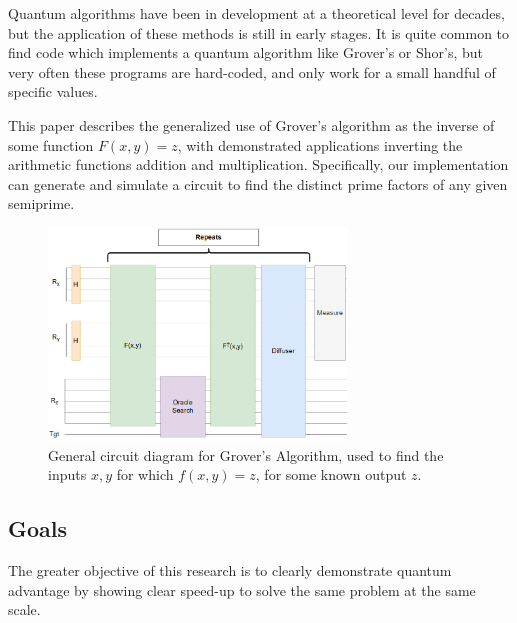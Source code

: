 \documentclass[twocolumn]{cinc}
\begin{document}
Quantum algorithms have been in development at a theoretical level for
decades, but the application of these methods is still in early stages.
It is quite common to find code which implements a quantum algorithm like
Grover's\cite{grover} or Shor's\cite{shor}, but very often these 
programs are hard-coded, and only
work for a small handful of specific values\cite{shors_ibm}.

This paper describes the generalized use of Grover's algorithm as the
inverse of some function $F(x, y) = z$, with demonstrated applications
inverting the arithmetic functions addition and multiplication. Specifically,
our implementation can generate and simulate a circuit to find the distinct prime
factors of any given semiprime.

\begin{figure}[ht]\label{fig:FIGURA1}
\centering
\includegraphics[width=7.9cm]{grover_inversion.png}
\caption{General circuit diagram for Grover's Algorithm, used to find 
the inputs $x, y$ for which $f(x,y)=z$, for some known output $z$.}
\end{figure}

  \subsection{Goals}

  The greater objective of this research is to clearly demonstrate quantum advantage 
  by showing clear speed-up to solve the same problem at the same scale.

  
\end{document}
